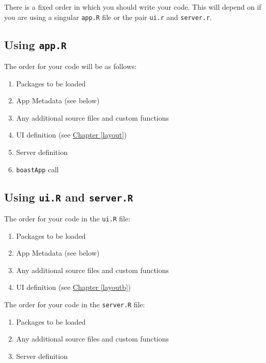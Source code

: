 \documentclass[
]{book}
\providecommand{\tightlist}{%
  \setlength{\itemsep}{0pt}\setlength{\parskip}{0pt}}
\begin{document}
There is a fixed order in which you should write your code. This will depend on if you are using a singular \texttt{app.R} file or the pair \texttt{ui.r} and \texttt{server.r}.

\hypertarget{using-app.r-1}{%
\subsection{\texorpdfstring{Using \texttt{app.R}}{Using app.R}}\label{using-app.r-1}}

The order for your code will be as follows:

\begin{enumerate}
\def\labelenumi{\arabic{enumi}.}
\tightlist
\item
  Packages to be loaded
\item
  App Metadata (see below)
\item
  Any additional source files and custom functions
\item
  UI definition (see \protect\hyperlink{layoutb}{Chapter \ref{layout}})
\item
  Server definition
\item
  \texttt{boastApp} call
\end{enumerate}

\hypertarget{using-ui.r-and-server.r-1}{%
\subsection{\texorpdfstring{Using \texttt{ui.R} and \texttt{server.R}}{Using ui.R and server.R}}\label{using-ui.r-and-server.r-1}}

The order for your code in the \texttt{ui.R} file:

\begin{enumerate}
\def\labelenumi{\arabic{enumi}.}
\tightlist
\item
  Packages to be loaded
\item
  App Metadata (see below)
\item
  Any additional source files and custom functions
\item
  UI definition (see \protect\hyperlink{layoutb}{Chapter \ref{layoutb}})
\end{enumerate}

The order for your code in the \texttt{server.R} file:

\begin{enumerate}
\def\labelenumi{\arabic{enumi}.}
\tightlist
\item
  Packages to be loaded
\item
  Any additional source files and custom functions
\item
  Server definition
\end{enumerate}
\end{document}

